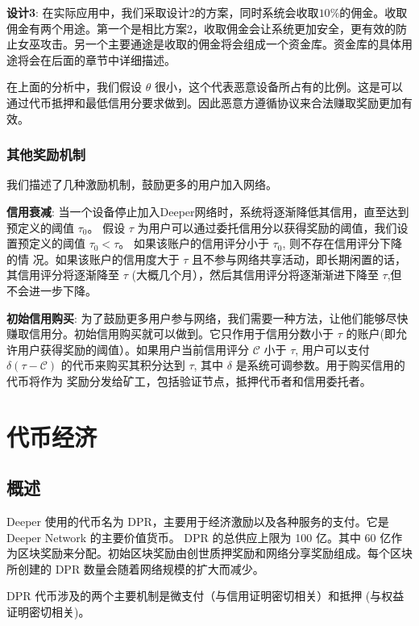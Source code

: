 \documentclass[a4paper]{article}
\begin{document}
\textbf{设计3}: 在实际应用中，我们采取设计2的方案，同时系统会收取$10\%$的佣金。收取佣金有两个用途。第一个是相比方案2，收取佣金会让系统更加安全，更有效的防止女巫攻击。另一个主要通途是收取的佣金将会组成一个资金库。资金库的具体用途将会在后面的章节中详细描述。

在上面的分析中，我们假设 $\theta$ 很小，这个代表恶意设备所占有的比例。这是可以通过代币抵押和最低信用分要求做到。因此恶意方遵循协议来合法赚取奖励更加有效。

\subsubsection{其他奖励机制}
我们描述了几种激励机制，鼓励更多的用户加入网络。

\textbf{信用衰减}: 当一个设备停止加入Deeper网络时，系统将逐渐降低其信用，直至达到预定义的阈值 $\tau_0$。 假设 $\tau$ 为用户可以通过委托信用分以获得奖励的阈值，我们设置预定义的阈值 $\tau_0 < \tau$。 如果该账户的信用评分小于 $\tau_0$, 则不存在信用评分下降的情
况。如果该账户的信用度大于 $\tau$ 且不参与网络共享活动，即长期闲置的话，其信用评分将逐渐降至 $\tau$ (大概几个月），然后其信用评分将逐渐渐进下降至 $\tau$,但不会进一步下降。

\textbf{初始信用购买}: 为了鼓励更多用户参与网络，我们需要一种方法，让他们能够尽快赚取信用分。初始信用购买就可以做到。它只作用于信用分数小于 $\tau$ 的账户(即允许用户获得奖励的阈值）。如果用户当前信用评分 $\mathcal{C}$ 小于 $\tau$, 用户可以支付 $\delta(\tau-\mathcal{C})$ 的代币来购买其积分达到 $\tau$, 其中 $\delta$ 是系统可调参数。用于购买信用的代币将作为 奖励分发给矿工，包括验证节点，抵押代币者和信用委托者。

\newpage
\section{代币经济}
\subsection{概述}
Deeper 使用的代币名为 DPR，主要用于经济激励以及各种服务的支付。它是 Deeper Network 的主要价值货币。
DPR 的总供应上限为 100 亿。其中 60 亿作为区块奖励来分配。初始区块奖励由创世质押奖励和网络分享奖励组成。每个区块所创建的 DPR 数量会随着网络规模的扩大而减少。

DPR 代币涉及的两个主要机制是微支付（与信用证明密切相关）和抵押 (与权益证明密切相关)。


\end{document}
